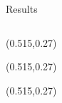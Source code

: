 \documentclass{beamer}
\begin{document}
\begin{frame}{Results}
\begin{columns}
\begin{center}
\begin{textblock}{0.48}(0.515,0.27)
\end{textblock}
\begin{textblock}{0.48}(0.515,0.27)
\end{textblock}
\begin{textblock}{0.48}(0.515,0.27)

\end{textblock}
\end{center}
\end{columns}
\end{frame}
\end{document}
